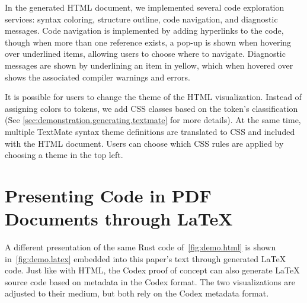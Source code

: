 In the generated HTML document, we implemented several code exploration services:
syntax coloring, structure outline, code navigation, and diagnostic messages.
Code navigation is implemented by adding hyperlinks to the code, though when more than one reference exists, a pop-up is shown when hovering over underlined items, allowing users to choose where to navigate.
Diagnostic messages are shown by underlining an item in yellow, which when hovered over shows the associated compiler warnings and errors.



It is possible for users to change the theme of the HTML visualization.
Instead of assigning colors to tokens, we add CSS classes based on the token's classification (See \cref{sec:demonstration.generating.textmate} for more details).
At the same time, multiple TextMate syntax theme definitions are translated to CSS and included with the HTML document.
Users can choose which CSS rules are applied by choosing a theme in the top left.


\section{Presenting Code in PDF Documents through LaTeX}
\label{sec:demonstration.latex}

A different presentation of the same Rust code of~\cref{fig:demo.html} is shown in~\cref{fig:demo.latex} embedded into this paper's text through generated LaTeX code.
Just like with HTML, the Codex proof of concept can also generate LaTeX source code based on metadata in the Codex format.
The two visualizations are adjusted to their medium, but both rely on the Codex metadata format.

